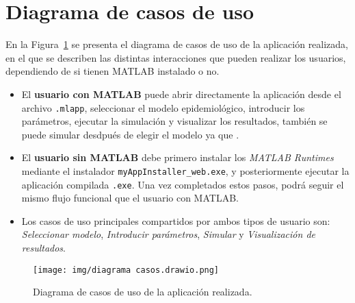 \section{Diagrama de casos de uso}


En la Figura~\ref{fig: casos de uso} se presenta el diagrama de casos de uso de la aplicación realizada, en el que se describen las distintas interacciones que pueden realizar los usuarios, dependiendo de si tienen MATLAB instalado o no.

\begin{itemize}
    \item El \textbf{usuario con MATLAB} puede abrir directamente la aplicación desde el archivo \texttt{.mlapp}, seleccionar el modelo epidemiológico, introducir los parámetros, ejecutar la simulación y visualizar los resultados, también se puede simular desdpués de elegir el modelo ya que .
    
    \item El \textbf{usuario sin MATLAB} debe primero instalar los \textit{MATLAB Runtimes} mediante el instalador \texttt{myAppInstaller\_web.exe}, y posteriormente ejecutar la aplicación compilada \texttt{.exe}. Una vez completados estos pasos, podrá seguir el mismo flujo funcional que el usuario con MATLAB.
    
    \item Los casos de uso principales compartidos por ambos tipos de usuario son: \textit{Seleccionar modelo}, \textit{Introducir parámetros}, \textit{Simular} y \textit{Visualización de resultados}.
\end{itemize}

\begin{figure}[H]
        \centering
        \texttt{[image: img/diagrama casos.drawio.png]}
        \caption{Diagrama de casos de uso de la aplicación realizada.}
        \label{fig: casos de uso}
        
\end{figure}


